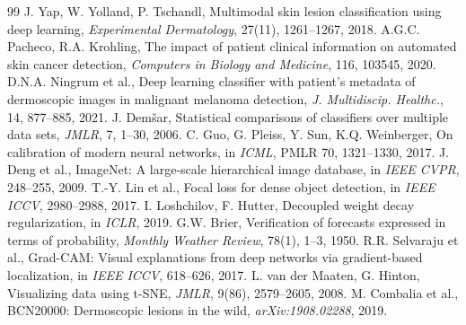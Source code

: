 \documentclass[12pt,a4paper]{article}
\begin{document}
\begin{thebibliography}{99}
 J. Yap, W. Yolland, P. Tschandl, Multimodal skin lesion classification using deep learning, \textit{Experimental Dermatology}, 27(11), 1261--1267, 2018.
 A.G.C. Pacheco, R.A. Krohling, The impact of patient clinical information on automated skin cancer detection, \textit{Computers in Biology and Medicine}, 116, 103545, 2020.
 D.N.A. Ningrum et al., Deep learning classifier with patient's metadata of dermoscopic images in malignant melanoma detection, \textit{J. Multidiscip. Healthc.}, 14, 877--885, 2021.
 J. Dem{\v{s}}ar, Statistical comparisons of classifiers over multiple data sets, \textit{JMLR}, 7, 1--30, 2006.
 C. Guo, G. Pleiss, Y. Sun, K.Q. Weinberger, On calibration of modern neural networks, in \textit{ICML}, PMLR 70, 1321--1330, 2017.
 J. Deng et al., ImageNet: A large-scale hierarchical image database, in \textit{IEEE CVPR}, 248--255, 2009.
 T.-Y. Lin et al., Focal loss for dense object detection, in \textit{IEEE ICCV}, 2980--2988, 2017.
 I. Loshchilov, F. Hutter, Decoupled weight decay regularization, in \textit{ICLR}, 2019.
 G.W. Brier, Verification of forecasts expressed in terms of probability, \textit{Monthly Weather Review}, 78(1), 1--3, 1950.
 R.R. Selvaraju et al., Grad-CAM: Visual explanations from deep networks via gradient-based localization, in \textit{IEEE ICCV}, 618--626, 2017.
 L. van der Maaten, G. Hinton, Visualizing data using t-SNE, \textit{JMLR}, 9(86), 2579--2605, 2008.
 M. Combalia et al., BCN20000: Dermoscopic lesions in the wild, \textit{arXiv:1908.02288}, 2019.
\end{thebibliography}
\end{document}
